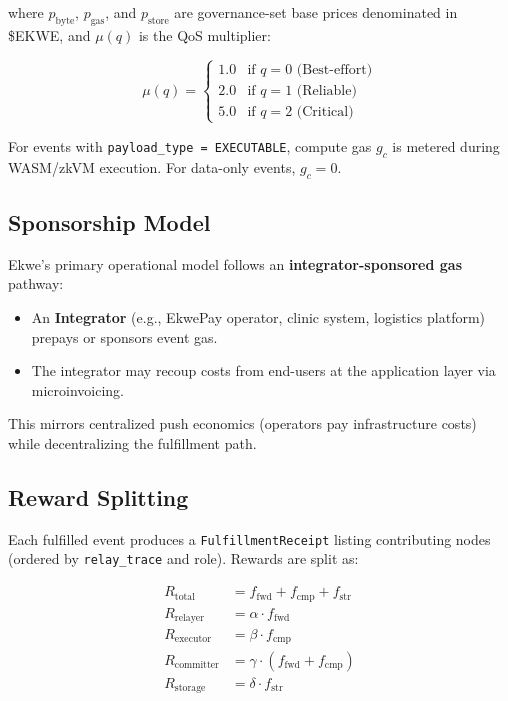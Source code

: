 \documentclass[11pt,a4paper]{article}
\begin{document}
where $p_{\text{byte}}$, $p_{\text{gas}}$, and $p_{\text{store}}$ are governance-set base prices denominated in \$EKWE, and $\mu(q)$ is the QoS multiplier:

\begin{equation}
\mu(q) = \begin{cases}
  1.0 & \text{if } q = 0 \text{ (Best-effort)} \\
  2.0 & \text{if } q = 1 \text{ (Reliable)} \\
  5.0 & \text{if } q = 2 \text{ (Critical)}
\end{cases}
\label{eq:qos_mult}
\end{equation}

For events with \texttt{payload\_type = EXECUTABLE}, compute gas $g_c$ is metered during WASM/zkVM execution. For data-only events, $g_c = 0$.

\subsection{Sponsorship Model}

Ekwe's primary operational model follows an \textbf{integrator-sponsored gas} pathway:
\begin{itemize}[nosep]
  \item An \textbf{Integrator} (e.g., EkwePay operator, clinic system, logistics platform) prepays or sponsors event gas.
  \item The integrator may recoup costs from end-users at the application layer via microinvoicing.
\end{itemize}

This mirrors centralized push economics (operators pay infrastructure costs) while decentralizing the fulfillment path.

\subsection{Reward Splitting}

Each fulfilled event produces a \texttt{FulfillmentReceipt} listing contributing nodes (ordered by \texttt{relay\_trace} and role). Rewards are split as:

\begin{align}
R_{\text{total}} &= f_{\text{fwd}} + f_{\text{cmp}} + f_{\text{str}} \\
R_{\text{relayer}} &= \alpha \cdot f_{\text{fwd}} \\
R_{\text{executor}} &= \beta \cdot f_{\text{cmp}} \\
R_{\text{committer}} &= \gamma \cdot (f_{\text{fwd}} + f_{\text{cmp}}) \\
R_{\text{storage}} &= \delta \cdot f_{\text{str}}
\end{align}
\end{document}
